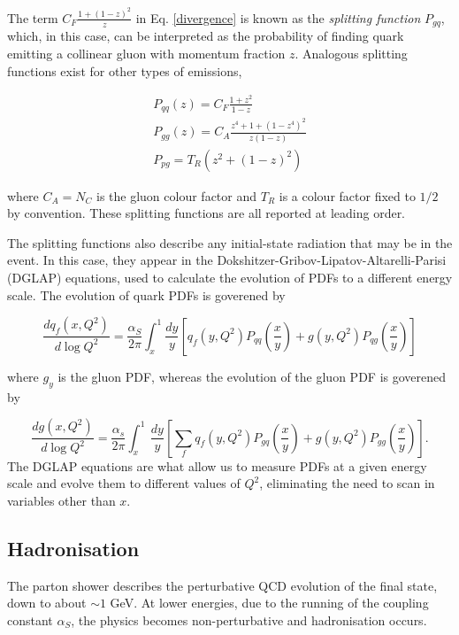 \documentclass[10pt,a4paper]{book}
\begin{document}
The term $C_F\frac{1 + (1-z)^2}{z}$ in Eq. \ref{divergence} is known as the \emph{splitting function} $P_{gq}$, which, in this case, can be interpreted as the probability of finding quark emitting a collinear gluon with momentum fraction $z$. Analogous splitting functions exist for other types of emissions, 

\begin{gather}
    P_{qq}(z) = C_F \frac{1 + z^2}{1 - z} \\
    P_{gg}(z) = C_A \frac{z^4 + 1 + (1 - z^4)^2}{z(1-z)} \\
    P_{pg} = T_R(z^2 + (1 - z)^2)
\end{gather}

where $C_A = N_C$ is the gluon colour factor and $T_R$ is a colour factor fixed to $1/2$ by convention. These splitting functions are all reported at leading order.

The splitting functions also describe any initial-state radiation that may be in the event. In this case, they appear in the Dokshitzer-Gribov-Lipatov-Altarelli-Parisi (DGLAP) equations, used to calculate the evolution of PDFs to a different energy scale. The evolution of quark PDFs is goverened by

\begin{equation}
    \frac{dq_f(x, Q^2)}{d\log Q^2} = \frac{\alpha_S}{2\pi}\int_x^1 \frac{dy}{y} \left[ q_f(y, Q^2)P_{qq}\left(\frac{x}{y}\right) + g(y, Q^2)P_{qg}\left(\frac{x}{y}\right) \right]
\end{equation}

where $g_y$ is the gluon PDF, whereas the evolution of the gluon PDF is goverened by

\begin{equation}
    \frac{dg(x,Q^2)}{d\log Q^2} = \frac{\alpha_s}{2\pi}\int_x^1 \, \frac{dy}{y} \left[\sum_f q_f(y,Q^2)P_{gq}\left(\frac{x}{y} \right) + g(y,Q^2)P_{gg}\left(\frac{x}{y} \right) \right].
\end{equation}
The DGLAP equations are what allow us to measure PDFs at a given energy scale and evolve them to different values of $Q^2$, eliminating the need to scan in variables other than $x$.

\subsection{Hadronisation}

The parton shower describes the perturbative QCD evolution of the final state, down to about $\sim1$ GeV. At lower energies, due to the running of the coupling constant $\alpha_S$, the physics becomes non-perturbative and hadronisation occurs.
\end{document}
